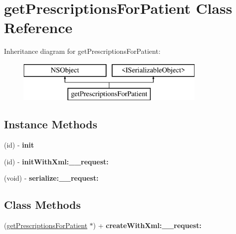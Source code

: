 \hypertarget{interfaceget_prescriptions_for_patient}{}\section{get\+Prescriptions\+For\+Patient Class Reference}
\label{interfaceget_prescriptions_for_patient}
Inheritance diagram for get\+Prescriptions\+For\+Patient\+:\begin{figure}[H]
\begin{center}
\leavevmode
\includegraphics[height=2.000000cm]{interfaceget_prescriptions_for_patient}
\end{center}
\end{figure}
\subsection*{Instance Methods}
\begin{DoxyCompactItemize}
\item 
\hypertarget{interfaceget_prescriptions_for_patient_a4687bae4b6d21b560afe231874b96042}{}(id) -\/ {\bfseries init}\label{interfaceget_prescriptions_for_patient_a4687bae4b6d21b560afe231874b96042}

\item 
\hypertarget{interfaceget_prescriptions_for_patient_a9b07da2c3a29e332cfddd8f6c40def7e}{}(id) -\/ {\bfseries init\+With\+Xml\+:\+\_\+\+\_\+request\+:}\label{interfaceget_prescriptions_for_patient_a9b07da2c3a29e332cfddd8f6c40def7e}

\item 
\hypertarget{interfaceget_prescriptions_for_patient_af36d0e4ae1ff2a43f2a4c5846f4f04ba}{}(void) -\/ {\bfseries serialize\+:\+\_\+\+\_\+request\+:}\label{interfaceget_prescriptions_for_patient_af36d0e4ae1ff2a43f2a4c5846f4f04ba}

\end{DoxyCompactItemize}
\subsection*{Class Methods}
\begin{DoxyCompactItemize}
\item 
\hypertarget{interfaceget_prescriptions_for_patient_ad6b7cf82ce639755d77f82f35e3a7b93}{}(\hyperlink{interfaceget_prescriptions_for_patient}{get\+Prescriptions\+For\+Patient} $\ast$) + {\bfseries create\+With\+Xml\+:\+\_\+\+\_\+request\+:}\label{interfaceget_prescriptions_for_patient_ad6b7cf82ce639755d77f82f35e3a7b93}

\end{DoxyCompactItemize}
